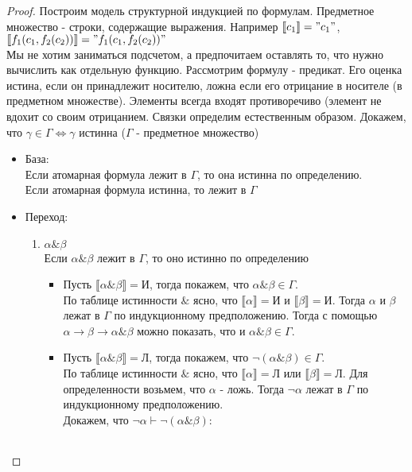 \begin{proof}
Построим модель структурной индукцией по формулам. Предметное множество - строки, содержащие выражения. Например $\llbracket c_1 \rrbracket = "c_1"$,
$\llbracket f_1 (c_1, f_2(c_2)) \rrbracket = " f_1 (c_1, f_2(c_2)) "$\\
Мы не хотим заниматься подсчетом, а предпочитаем оставлять то, что нужно вычислить как отдельную функцию. Рассмотрим формулу - предикат. Его оценка истина, если он принадлежит носителю, ложна если его отрицание в носителе (в предметном множестве). Элементы всегда входят противоречиво (элемент не вдохит со своим отрицанием. Связки определим естественным образом. Докажем, что $\gamma \in \Gamma \Leftrightarrow \gamma$ истинна ($\Gamma$ - предметное множество)
\begin{itemize}
\item База:\\
Если атомарная формула лежит в $\Gamma$, то она истинна по определению.\\
Если атомарная формула истинна, то лежит в $\Gamma$
\item Переход:
\begin{enumerate}
\item $\alpha \& \beta$\\
Если $\alpha \& \beta$ лежит в $\Gamma$, то оно истинно по определению\\
\begin{itemize}
\item Пусть $\llbracket \alpha \& \beta \rrbracket = \texttt{И}$, тогда покажем, что $\alpha \& \beta \in \Gamma$.\\
По таблице истинности $\&$ ясно, что $\llbracket \alpha \rrbracket = \texttt{И}$ и $\llbracket \beta \rrbracket = \texttt{И}$. Тогда $\alpha$ и $\beta$ лежат в $\Gamma$ по индукционному предположению. Тогда с помощью $\alpha \to \beta \to \alpha \& \beta$ можно показать, что и $\alpha \& \beta \in \Gamma$.
\item Пусть $\llbracket \alpha \& \beta \rrbracket = \texttt{Л}$, тогда покажем, что $\neg(\alpha \& \beta) \in \Gamma$.\\
По таблице истинности $\&$ ясно, что $\llbracket \alpha \rrbracket = \texttt{Л}$ или $\llbracket \beta \rrbracket = \texttt{Л}$. Для определенности возьмем, что $\alpha$ - ложь. Тогда $\neg \alpha$ лежат в $\Gamma$ по индукционному предположению.\\
Докажем, что $\neg \alpha \vdash \neg (\alpha \& \beta)$:\\
\begin{tabular}{lll}

\end{tabular}
\end{itemize}
\end{enumerate}
\end{itemize}
\end{proof}
